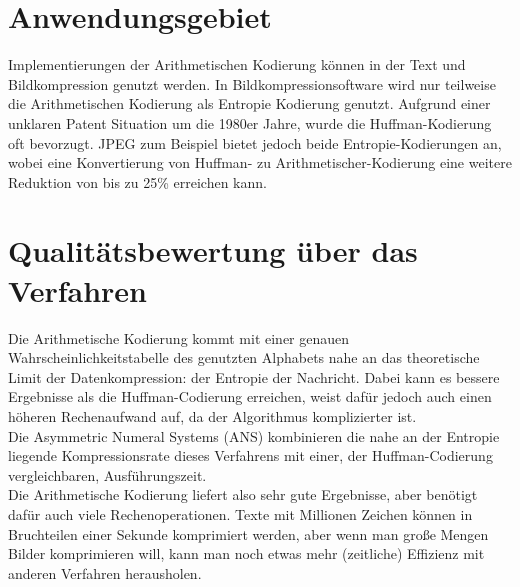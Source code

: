 \documentclass[a4paper]{article}
\theoremstyle{definition}
\theoremstyle{remark}
\begin{document}
		\section{Anwendungsgebiet}
	Implementierungen der Arithmetischen Kodierung können in der Text und Bildkompression genutzt werden. In Bildkompressionsoftware wird nur  teilweise die Arithmetischen Kodierung als Entropie Kodierung genutzt. Aufgrund einer unklaren Patent Situation um die 1980er Jahre, wurde die Huffman-Kodierung oft bevorzugt\cite{WIKI-EN}. JPEG zum Beispiel bietet jedoch beide Entropie-Kodierungen an, wobei eine Konvertierung von Huffman- zu Arithmetischer-Kodierung eine weitere Reduktion von bis zu 25\% erreichen kann.
	
			\section{Qualitätsbewertung über das Verfahren}
	Die Arithmetische Kodierung kommt mit einer genauen Wahrscheinlichkeitstabelle des genutzten Alphabets nahe an das theoretische Limit der Datenkompression: der Entropie der Nachricht. Dabei kann es bessere Ergebnisse als die Huffman-Codierung erreichen, weist dafür jedoch auch einen höheren Rechenaufwand auf, da der Algorithmus komplizierter ist.\\
	Die Asymmetric Numeral Systems (ANS)\cite{WIKI-ANS} kombinieren die nahe an der Entropie liegende Kompressionsrate dieses Verfahrens mit einer, der Huffman-Codierung vergleichbaren, Ausführungszeit.\\
	Die Arithmetische Kodierung liefert also sehr gute Ergebnisse, aber benötigt dafür auch viele Rechenoperationen. Texte mit Millionen Zeichen können in Bruchteilen einer Sekunde komprimiert werden, aber wenn man große Mengen Bilder komprimieren will, kann man noch etwas mehr (zeitliche) Effizienz mit anderen Verfahren herausholen.
	
	\newpage
\end{document}
